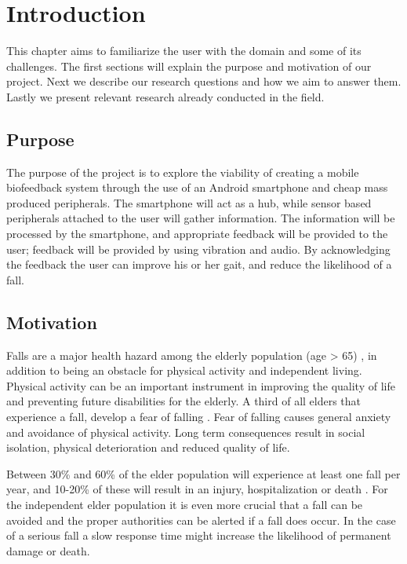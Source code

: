 \chapter{Introduction}
This chapter aims to familiarize the user with the domain and some of its challenges. The first sections will explain the purpose and motivation of our project. Next we describe our research questions and how we aim to answer them.  Lastly we present relevant research already conducted in the field.

\section{Purpose}
The purpose of the project is to explore the viability of creating a mobile biofeedback system through the use of an Android smartphone and cheap mass produced peripherals. The smartphone will act as a hub, while sensor based peripherals attached to the user will gather information. The information will be processed by the smartphone, and appropriate feedback will be provided to the user; feedback will be provided by using vibration and audio. By acknowledging the feedback the user can improve his or her gait, and reduce the likelihood of a fall.

\section{Motivation}
Falls are a major health hazard among the elderly population (age \textgreater{} 65) \cite{fallsHealthHazard}, in addition to being an obstacle for physical activity and independent living. Physical activity can be an important instrument in improving the quality of life and preventing future disabilities for the elderly\cite{physicalActivity}. A third of all elders that experience a fall, develop a fear of falling \cite{fearOfFalling}. Fear of falling causes general anxiety and avoidance of physical activity. Long term consequences result in social isolation, physical deterioration and reduced quality of life.\cite{physicalAvoidance} %

Between 30\% and 60\% of the elder population will experience at least one fall per year, and 10-20\% of these will result in an injury, hospitalization or death \cite{fallStatistics}. For the independent elder population it is even more crucial that a fall can be avoided and the proper authorities can be alerted if a fall does occur. In the case of a serious fall a slow response time might increase the likelihood of permanent damage or death\cite{personHomeDeath, dangerousFallHome}.

